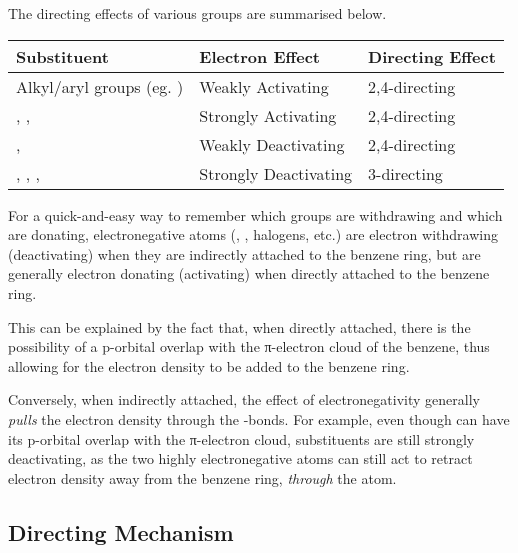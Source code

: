 			The directing effects of various groups are summarised below.


			\begin{center}\begin{table}[htb]\renewcommand{\arraystretch}{1.5}
			\begin{tabu} to \textwidth {| X[-4,c,m] | X[c,m] | X[c,m] |}

				\hline
							Substituent						&	Electron Effect			&	Directing Effect	\\	\hline
				Alkyl/aryl groups (eg. )			&	Weakly Activating		&	2,4-directing		\\	\hline
				, , 				&	Strongly Activating		&	2,4-directing		\\	\hline
				\ch{-\chlorine}, 					&	Weakly Deactivating		&	2,4-directing		\\	\hline
				, , , 	&	Strongly Deactivating	&	3-directing			\\	\hline

			\end{tabu}
			\end{table}\end{center}\vspace{-10mm}


			For a quick-and-easy way to remember which groups are withdrawing and which are donating, electronegative atoms (,
			, halogens, etc.) are electron withdrawing (deactivating) when they are indirectly attached to the benzene ring, but
			are generally electron donating (activating) when directly attached to the benzene ring.

			This can be explained by the fact that, when directly attached, there is the possibility of a p-orbital overlap with the
			π-electron cloud of the benzene, thus allowing for the electron density to be added to the benzene ring.

			Conversely, when indirectly attached, the effect of electronegativity generally \textit{pulls} the electron density
			through the \chemsigma-bonds. For example, even though  can have its p-orbital overlap with the π-electron cloud,
			 substituents are still strongly deactivating, as the two highly electronegative  atoms can still act
			to retract electron density away from the benzene ring, \textit{through} the  atom.



			\subsection{Directing Mechanism}

